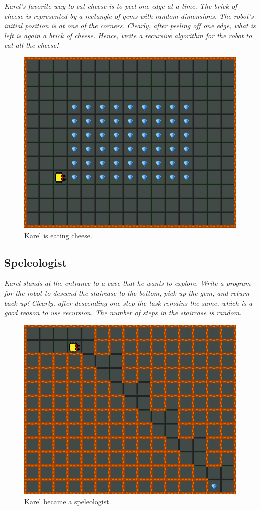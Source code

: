 {\em Karel's favorite way to eat cheese is to peel one edge at a time. The brick of cheese is represented by a rectangle of gems with random dimensions. The robot's initial position is at one of the corners. Clearly, after peeling off one edge, what is left is again a brick of cheese. Hence, write a recursive algorithm for the robot to eat all the cheese!}%

\begin{figure}[!ht]
\begin{center}
\includegraphics[height=0.4\textwidth]{img/g01.png}
\end{center}
\vspace{-4mm}
\caption{Karel is eating cheese.}
\label{fig:g01}
\end{figure}

\newpage

\subsection{Speleologist}

{\em Karel stands at the entrance to a cave that he wants to explore. Write a program for the robot to descend the staircase to the bottom, pick up the gem, and return back up! Clearly, after descending one step the task remains the same, which is a good reason to use recursion. The number of steps in the staircase is random.}%

\begin{figure}[!ht]
\begin{center}
\includegraphics[height=0.4\textwidth]{img/g02.png}
\end{center}
\vspace{-4mm}
\caption{Karel became a speleologist.}
\label{fig:g02}
\end{figure}

